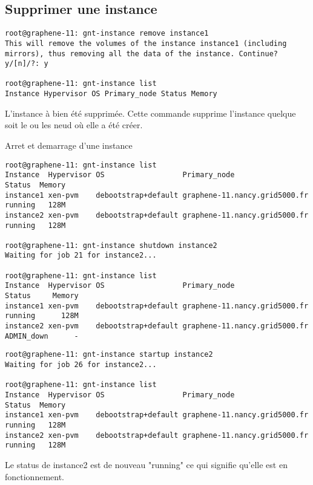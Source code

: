 \subsection{Supprimer une instance}
\begin{lstlisting}
root@graphene-11: gnt-instance remove instance1
This will remove the volumes of the instance instance1 (including
mirrors), thus removing all the data of the instance. Continue?
y/[n]/?: y

root@graphene-11: gnt-instance list
Instance Hypervisor OS Primary_node Status Memory
\end{lstlisting}
L'instance à bien été supprimée. Cette commande supprime l'instance quelque soit le ou les neud où elle a été créer.


Arret et demarrage d'une instance
\begin{lstlisting}
root@graphene-11: gnt-instance list
Instance  Hypervisor OS                  Primary_node                  Status  Memory
instance1 xen-pvm    debootstrap+default graphene-11.nancy.grid5000.fr running   128M
instance2 xen-pvm    debootstrap+default graphene-11.nancy.grid5000.fr running   128M

root@graphene-11: gnt-instance shutdown instance2
Waiting for job 21 for instance2...

root@graphene-11: gnt-instance list
Instance  Hypervisor OS                  Primary_node                  Status     Memory
instance1 xen-pvm    debootstrap+default graphene-11.nancy.grid5000.fr running      128M
instance2 xen-pvm    debootstrap+default graphene-11.nancy.grid5000.fr ADMIN_down      -
\end{lstlisting}


\begin{lstlisting}
root@graphene-11: gnt-instance startup instance2
Waiting for job 26 for instance2...

root@graphene-11: gnt-instance list
Instance  Hypervisor OS                  Primary_node                  Status  Memory
instance1 xen-pvm    debootstrap+default graphene-11.nancy.grid5000.fr running   128M
instance2 xen-pvm    debootstrap+default graphene-11.nancy.grid5000.fr running   128M
\end{lstlisting}
Le status de instance2 est de nouveau "running" ce qui signifie qu'elle est en fonctionnement.

